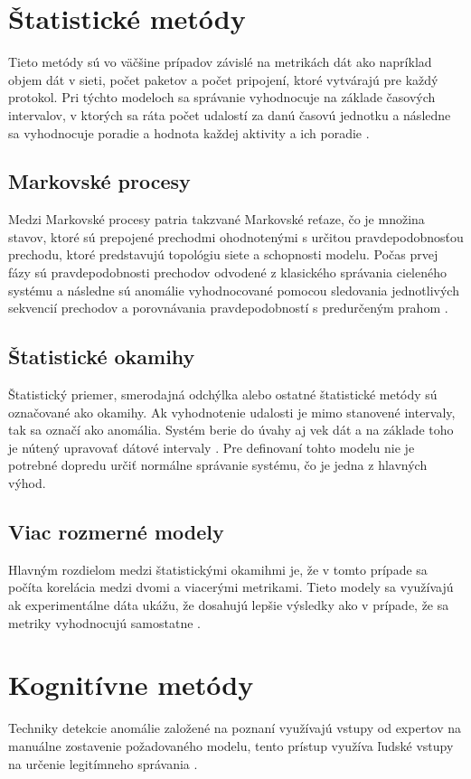 \section{Štatistické metódy}
Tieto metódy sú vo väčšine prípadov závislé na metrikách dát ako napríklad objem dát v sieti, počet paketov a počet pripojení, ktoré vytvárajú pre každý protokol. Pri týchto modeloch sa správanie vyhodnocuje na základe časových intervalov, v ktorých sa ráta počet udalostí za danú časovú jednotku a následne sa vyhodnocuje poradie a hodnota každej aktivity a ich poradie \cite{AnomalyDetection}.

\subsection*{Markovské procesy}
Medzi Markovské procesy patria takzvané Markovské reťaze, čo je množina stavov, ktoré sú prepojené prechodmi ohodnotenými s určitou pravdepodobnosťou prechodu, ktoré predstavujú topológiu siete a schopnosti modelu. Počas prvej fázy sú pravdepodobnosti prechodov odvodené z klasického správania cieleného systému a následne sú anomálie vyhodnocované pomocou sledovania jednotlivých sekvencií prechodov a porovnávania pravdepodobností s predurčeným prahom \cite{AnomalyMarkovs}.

\subsection*{Štatistické okamihy}
Štatistický priemer, smerodajná odchýlka alebo ostatné štatistické metódy sú označované ako okamihy. Ak vyhodnotenie udalosti je mimo stanovené intervaly, tak sa označí ako anomália. Systém berie do úvahy aj vek dát a na základe toho je nútený upravovať dátové intervaly \cite{anomaly-book}. Pre definovaní tohto modelu nie je potrebné dopredu určiť normálne správanie systému, čo je jedna z hlavných výhod.

\subsection*{Viac rozmerné modely}
Hlavným rozdielom medzi štatistickými okamihmi je, že v tomto prípade sa počíta korelácia medzi dvomi a viacerými metrikami. Tieto modely sa využívajú ak experimentálne dáta ukážu, že dosahujú lepšie výsledky ako v prípade, že sa metriky vyhodnocujú samostatne \cite{anomaly-book}. 

\section{Kognitívne metódy}
Techniky detekcie anomálie založené na poznaní využívajú vstupy od expertov na manuálne zostavenie požadovaného modelu, tento prístup využíva ľudské vstupy na určenie legitímneho správania \cite{Anomaly-Clarke-Yair}.


